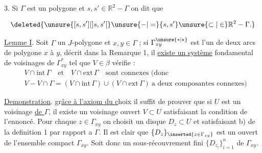 %
\uline{} 3. Si $\Gamma$ est un polygone et $s,s'\in\mathbb{R}^{2}-\Gamma$ on dit que

%
%
\[
\deleted{\unsure{[s,s']|]s,s'[}\unsure{-|=}\{s,s'\}\unsure{\subset|\in}\mathbb{R}^{2}-\Gamma.}
\]

%
\uline{Lemme I}. Soit $\Gamma$ un $J$-polygone et $x,y\in\Gamma$  ; si $\Gamma^{\unsure{*|\star}}_{xy}$ est l'un de deux arcs de polygone  $x$ à $y$, décrit dans la Remarque 1, il \uline{existe un système} fondamental  de voisinages \deleted{$\beta$}  de $\Gamma^{*}_{xy}$ tel que $V\in\beta$ vérifie :
\margin{$\cdot$}
\[
\begin{aligned}
&V\cap\mathrm{int}\,\Gamma\quad\text{et}\quad V\cap\mathrm{ext}\,\Gamma\quad\text{sont connexes (donc}\\
&V-V\cap\Gamma=(V\cap\mathrm{int}\,\Gamma)\cup(V\cap\mathrm{ext}\,\Gamma)\ \text{a deux composantes connexes)}
\end{aligned}
\]

\margin{!}\uline{Demonstration}. gr\uline{âce à l'axiom du c}hoix il suffit de prouver que si $U$ est un voisinage \uline{de $\Gamma$}, il existe un voisinage ouvert $V\subset U$ satisfaisant  la condition de l'ennoncé. Pour chaque $z\in\Gamma_{xy}$ on choisit un disque  $D_{z}\subset U$ et satisfaisant b) de la definition 1 par rapport a $\Gamma$. Il est clair que $\{D_{z}\}_{\inserted{z\in\Gamma_{xy}}}$ est un  ouvert de l'ensemble compact $\Gamma_{xy}$. Soit donc un sous-récouvrement fini $\{D_{z_{i}}\}^{n}_{i=1}$ de $\Gamma_{xy}$.

